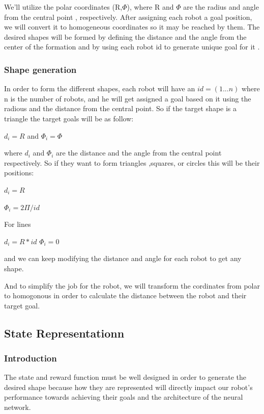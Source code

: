\documentclass[12pt]{extarticle}
\begin{document}
We'll utilize the polar coordinates (R,$\Phi$), where R and $\Phi$ are the radius and angle from the central point , respectively. After assigning each robot a goal position, we will convert it to homogeneous coordinates so  it may be reached  by them. The desired shapes will be formed by defining the distance and the angle  from the center of the formation and by using each robot id to generate unique goal for it .
\pagebreak
\subsubsection{Shape generation}

In order to form the different shapes, each robot will have an $id=(1...n)$ 
where n is the number of robots, and he will get assigned a goal based on it
using the radious and the distance from the central point. So if the target shape is a triangle the target goals will be as follow:

           $d_{i}=R$ and 
           $\Phi_{i}=\Phi$

where $d_{i}$ and  $\Phi_{i}$ are the distance and the angle from the central point respectively. So if they want to form triangles ,squares, or circles this will be their positions:


 			$d_{i}=R$

			$\Phi_{i}=2\Pi/id$

For lines

$d_{i}=R*id$
$\Phi_{i}=0$

and we can keep modifying the distance and angle for each robot to get any shape.

And to simplify the job for the robot, we will transform the cordinates from polar to homogonous in order to calculate the distance between the robot and their target goal. 





\subsection{State Representationn}

\subsubsection{Introduction}
The state and reward function must be well designed in order to generate the desired shape because how they are represented will directly impact our robot's performance towards achieving their goals and the architecture of the neural network.
\end{document}
